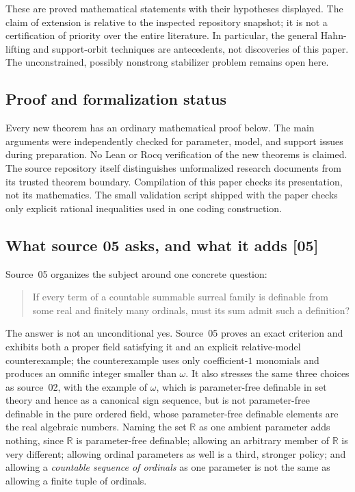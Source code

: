 \documentclass[11pt,a4paper]{article}
\numberwithin{equation}{section}
\theoremstyle{definition}
\theoremstyle{remark}
\newcommand{\R}{\mathbb R}
\newcommand{\src}[1]{\textup{\textsf{\small[#1]}}}
\begin{document}
These are proved mathematical statements with their hypotheses displayed.
The claim of extension is relative to the inspected repository snapshot;
it is not a certification of priority over the entire literature.
In particular, the general Hahn-lifting and support-orbit techniques are
antecedents, not discoveries of this paper. The unconstrained, possibly
nonstrong stabilizer problem remains open here.

\subsection{Proof and formalization status}

Every new theorem has an ordinary mathematical proof below. The main
arguments were independently checked for parameter, model, and support
issues during preparation. No Lean or Rocq verification of the new
theorems is claimed. The source repository itself distinguishes
unformalized research documents from its trusted theorem boundary.
Compilation of this paper checks its presentation, not its mathematics.
The small validation script shipped with the paper checks only explicit
rational inequalities used in one coding construction.


\subsection{What source 05 asks, and what it adds \src{05}}
\label{dsn:ca:sec:intro}

Source~05 organizes the subject around one concrete question:
\begin{quote}
If every term of a countable summable surreal family is definable from
some real and finitely many ordinals, must its sum admit such a definition?
\end{quote}
The answer is not an unconditional yes. Source~05 proves an exact
criterion and exhibits both a proper field satisfying it and an explicit
relative-model counterexample; the counterexample uses only
coefficient-$1$ monomials and produces an omnific integer smaller than
$\omega$. It also stresses the same three choices as source~02, with the
example of $\omega$, which is parameter-free definable in set theory and
hence as a canonical sign sequence, but is not parameter-free definable in
the pure ordered field, whose parameter-free definable elements are the
real algebraic numbers. Naming the set $\R$ as one ambient parameter adds
nothing, since $\R$ is parameter-free definable; allowing an arbitrary
member of $\R$ is very different; allowing ordinal parameters as well is a
third, stronger policy; and allowing a \emph{countable sequence of
ordinals} as one parameter is not the same as allowing a finite tuple of
ordinals.
\end{document}
